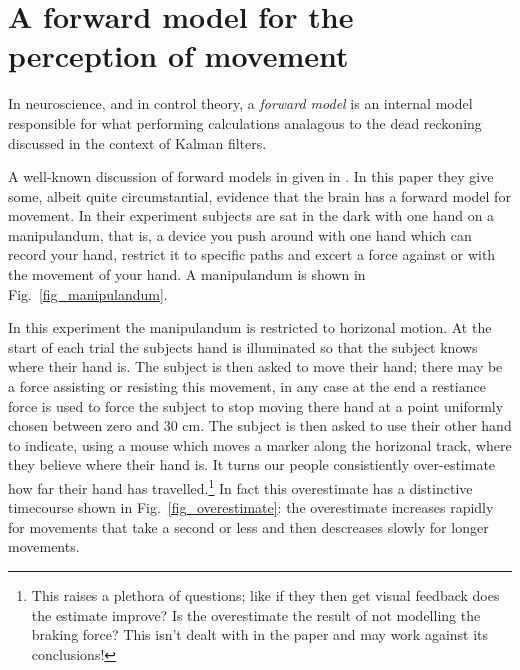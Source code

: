 \documentclass[12pt]{article}
\begin{document}
\section*{A forward model for the perception of movement}

In neuroscience, and in control theory, a \textsl{forward model} is an
internal model responsible for what performing calculations analagous
to the dead reckoning discussed in the context of Kalman filters.

A well-known discussion of forward models in given in
\cite{WolpertEtAl1995}. In this paper they give some, albeit quite
circumstantial, evidence that the brain has a forward model for
movement. In their experiment subjects are sat in the dark with one
hand on a manipulandum, that is, a device you push around with one
hand which can record your hand, restrict it to specific paths and
excert a force against or with the movement of your hand. A
manipulandum is shown in Fig.~\ref{fig_manipulandum}.

In this experiment the manipulandum is restricted to horizonal
motion. At the start of each trial the subjects hand is illuminated so
that the subject knows where their hand is. The subject is then asked
to move their hand; there may be a force assisting or resisting this
movement, in any case at the end a restiance force is used to force
the subject to stop moving there hand at a point uniformly chosen
between zero and 30 cm.  The subject is then asked to use their other
hand to indicate, using a mouse which moves a marker along the
horizonal track, where they believe where their hand is. It turns our
people consistiently over-estimate how far their hand has
travelled.\footnote{This raises a plethora of questions; like if they
  then get visual feedback does the estimate improve? Is the
  overestimate the result of not modelling the braking force? This
  isn't dealt with in the paper and may work against its conclusions!}
In fact this overestimate has a distinctive timecourse shown in
Fig.~\ref{fig_overestimate}: the overestimate increases rapidly for
movements that take a second or less and then descreases slowly for
longer movements.
\end{document}
